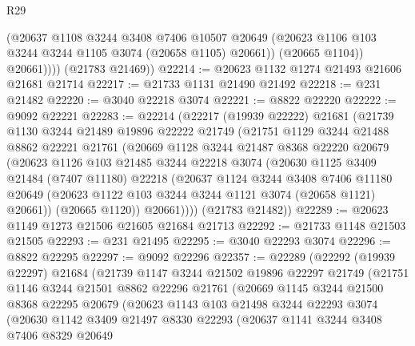 \begin{lexlean}{R29}
\begin{coremodule}
                (@20637
                  @1108
                  @3244
                  @3408
                  @7406
                  @10507
                  @20649
                  (@20623 @1106 @103 @3244 @3244 @1105 @3074 (@20658 @1105) @20661))
                (@20665 @1104))
              @20661))))
      (@21783 @21469))
@22214 := @20623 @1132 @1274 @21493 @21606 @21681 @21714
@22217 := @21733 @1131 @21490 @21492
@22218 := @231 @21482
@22220 := @3040 @22218 @3074
@22221 := @8822 @22220
@22222 := @9092 @22221
@22283 := @22214
    (@22217
      (@19939 @22222)
      @21681
      (@21739
        @1130
        @3244
        @21489
        @19896
        @22222
        @21749
        (@21751
          @1129
          @3244
          @21488
          @8862
          @22221
          @21761
          (@20669
            @1128
            @3244
            @21487
            @8368
            @22220
            @20679
            (@20623
              @1126
              @103
              @21485
              @3244
              @22218
              @3074
              (@20630
                @1125
                @3409
                @21484
                (@7407 @11180)
                @22218
                (@20637
                  @1124
                  @3244
                  @3408
                  @7406
                  @11180
                  @20649
                  (@20623 @1122 @103 @3244 @3244 @1121 @3074 (@20658 @1121) @20661))
                (@20665 @1120))
              @20661))))
      (@21783 @21482))
@22289 := @20623 @1149 @1273 @21506 @21605 @21684 @21713
@22292 := @21733 @1148 @21503 @21505
@22293 := @231 @21495
@22295 := @3040 @22293 @3074
@22296 := @8822 @22295
@22297 := @9092 @22296
@22357 := @22289
    (@22292
      (@19939 @22297)
      @21684
      (@21739
        @1147
        @3244
        @21502
        @19896
        @22297
        @21749
        (@21751
          @1146
          @3244
          @21501
          @8862
          @22296
          @21761
          (@20669
            @1145
            @3244
            @21500
            @8368
            @22295
            @20679
            (@20623
              @1143
              @103
              @21498
              @3244
              @22293
              @3074
              (@20630
                @1142
                @3409
                @21497
                @8330
                @22293
                (@20637
                  @1141
                  @3244
                  @3408
                  @7406
                  @8329
                  @20649

\end{coremodule}
\end{lexlean}
